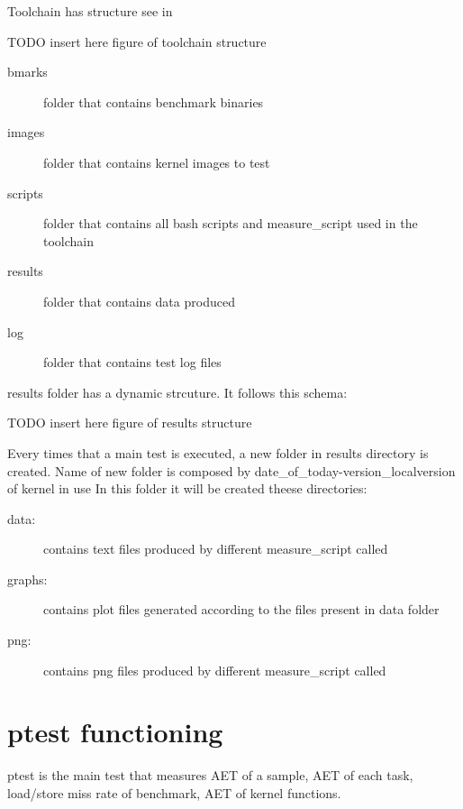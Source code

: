 \documentclass[a4paper,10pt]{article}
\begin{document}
\begin{multicols}{2}
Toolchain has structure see in 

TODO insert here figure of toolchain structure

\begin{description}
	\item[bmarks] folder that contains benchmark binaries 
	\item[images] folder that contains kernel images to test
	\item[scripts] folder that contains all bash scripts and measure\_script used in the toolchain
	\item[results] folder that contains data produced
	\item[log] folder that contains test log files
\end{description}

results folder has a dynamic strcuture. It follows this schema:

TODO insert here figure of results structure

Every times that a main test is executed, a new folder in results directory is created.
Name of new folder is composed by date\_of\_today-version\_localversion of kernel in use
In this folder it will be created theese directories:

\begin{description}
	\item[data:] contains text files produced by different measure\_script called
	\item[graphs:] contains plot files generated according to the files present in data folder
	\item[png:] contains png files produced by different measure\_script called
\end{description}


\section{ptest functioning}

ptest is the main test that measures AET of a sample, AET of each task, load/store 
miss rate of benchmark, AET of kernel functions.


\end{multicols}
\end{document}
